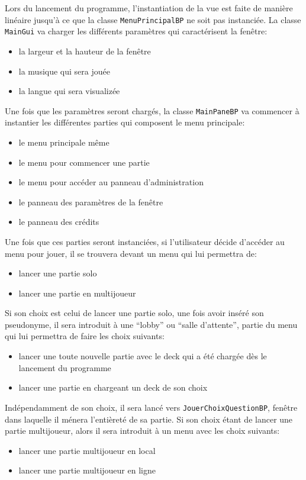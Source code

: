 Lors du lancement du programme, l'instantiation de la vue est faite de manière linéaire jusqu'à ce que la classe \verb|MenuPrincipalBP| ne soit pas instanciée.
La classe \verb|MainGui| va charger les différents paramètres qui caractérisent la fenêtre:
\begin{itemize}
\item la largeur et la hauteur de la fenêtre
\item la musique qui sera jouée
\item la langue qui sera visualizée
\end{itemize}
Une fois que les paramètres seront chargés, la classe \verb|MainPaneBP| va commencer à instantier les différentes parties qui composent le menu principale:
\begin{itemize}
\item le menu principale même
\item le menu pour commencer une partie
\item le menu pour accéder au panneau d'administration
\item le panneau des paramètres de la fenêtre
\item le panneau des crédits
\end{itemize}
Une fois que ces parties seront instanciées, si l'utilisateur décide d'accéder au menu pour jouer, il se trouvera devant un menu qui lui permettra de:
\begin{itemize}
\item lancer une partie solo
\item lancer une partie en multijoueur
\end{itemize}
Si son choix est celui de lancer une partie solo, une fois avoir inséré son pseudonyme, il sera introduit à une \enquote{lobby} ou \enquote{salle d'attente}, partie du menu qui lui permettra de faire les choix suivants:
\begin{itemize}
\item lancer une toute nouvelle partie avec le deck qui a été chargée dès le lancement du programme
\item lancer une partie en chargeant un deck de son choix
\end{itemize}
Indépendamment de son choix, il sera lancé vers \verb|JouerChoixQuestionBP|, fenêtre dans laquelle il ménera l'entièreté de sa partie.
Si son choix étant de lancer une partie multijoueur, alors il sera introduit à un menu avec les choix suivants:
\begin{itemize}
\item lancer une partie multijoueur en local
\item lancer une partie multijoueur en ligne
\end{itemize}

